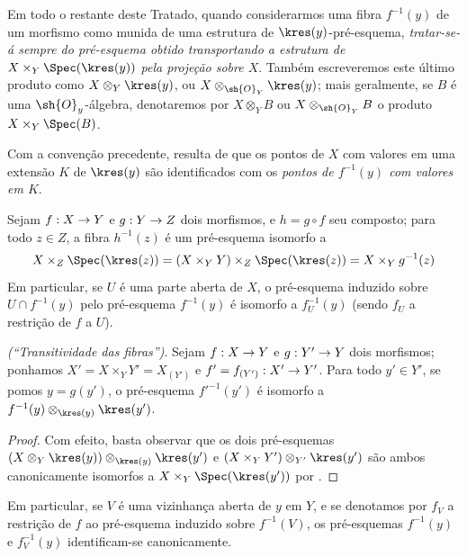 \documentclass[oneside]{amsart}
\makeatletter
\newcommand{\ega@arrow}[2]{\mathchoice{#1}{#2}{#2}{#2}}
\renewcommand{\to}{\ega@arrow{\longrightarrow}{\rightarrow}}
\newcommand{\oldpage}[2][]{{\marginnote{\normalfont\textbf{#1}~|~#2}}\ignorespaces}
\let\EGAOriginalLabel\label
\renewcommand{\label}[1]{\phantomsection\EGAOriginalLabel{#1}}
\makeatother
\begin{document}
\begin{env}[3.6.2]
\label{I.3.6.2}
Em todo o restante deste Tratado, quando considerarmos uma fibra $f^{-1}(y)$ de um morfismo como munida de uma estrutura de $\kres(y)$-pré-esquema, \emph{tratar-se-á sempre do pré-esquema obtido transportando a estrutura de $X\times_Y\Spec(\kres(y))$ pela projeção sobre $X$}.
Também escreveremos este último produto como $X\otimes_Y\kres(y)$, ou $X\otimes_{\sh{O}_Y}\kres(y)$; mais geralmente, se $B$ é uma $\sh{O}_y$-álgebra, denotaremos por $X\otimes_Y B$ ou $X\otimes_{\sh{O}_Y}B$ o produto $X\times_Y\Spec(B)$.
\end{env}

Com a convenção precedente, resulta de  que os pontos de $X$ com valores em uma extensão $K$ de $\kres(y)$ são identificados com os \emph{pontos de $f^{-1}(y)$ com valores em $K$}.

\begin{env}[3.6.3]
\label{I.3.6.3}
Sejam $f:X\to Y$ e $g:Y\to Z$ dois morfismos, e $h=g\circ f$ seu composto; para todo $z\in Z$, a fibra $h^{-1}(z)$ é um pré-esquema isomorfo a
\[
  X\times_Z\Spec(\kres(z))=(X\times_Y Y)\times_Z\Spec(\kres(z))=X\times_Y g^{-1}(z)
\]
\oldpage[I]{118}
Em particular, se $U$ é uma parte aberta de $X$, o pré-esquema induzido sobre $U\cap f^{-1}(y)$ pelo pré-esquema $f^{-1}(y)$ é isomorfo a $f^{-1}_U(y)$ (sendo $f_U$ a restrição de $f$ a $U$).
\end{env}

\begin{proposition}[3.6.4]
\label{I.3.6.4}
\emph{(``Transitividade das fibras'')}. Sejam $f:X\to Y$ e $g:Y'\to Y$ dois morfismos; ponhamos $X'=X\times_Y Y'=X_{(Y')}$ e $f'=f_{(Y')}:X'\to Y'$.
Para todo $y'\in Y'$, se pomos $y=g(y')$, o pré-esquema $f'^{-1}(y')$ é isomorfo a $f^{-1}(y)\otimes_{\kres(y)}\kres(y')$.
\end{proposition}

\begin{proof}
Com efeito, basta observar que os dois pré-esquemas $(X\otimes_Y\kres(y))\otimes_{\kres(y)}\kres(y')$ e $(X\times_Y Y')\otimes_{Y'}\kres(y')$ são ambos canonicamente isomorfos a $X\times_Y\Spec(\kres(y'))$ por .
\end{proof}

Em particular, se $V$ é uma vizinhança aberta de $y$ em $Y$, e se denotamos por $f_V$ a restrição de $f$ ao pré-esquema induzido sobre $f^{-1}(V)$, os pré-esquemas $f^{-1}(y)$ e $f^{-1}_V(y)$ identificam-se canonicamente.
\end{document}
